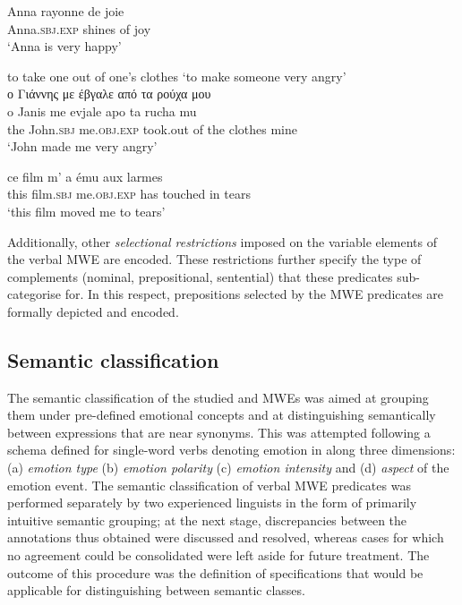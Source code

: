 \documentclass[output=paper]{langsci/langscibook}
\begin{document}
\begin{exe}
\ex \label{ex:3:36}
\gll Anna rayonne de joie \\
Anna.\textsc{sbj.exp} shines of joy\\
\glt ‘Anna is very happy’
\end{exe}

\begin{exe}
\ex \label{ex:3:37}
to take one out of one's clothes `to make someone very angry'\\
\glll ο Γιάννης με έβγαλε από τα ρούχα μου \\
o Janis me evjale apo ta rucha mu\\
the John.\textsc{sbj} me.\textsc{obj.exp} took.out of the clothes mine\\
\glt  %
‘John made me very angry’
\end{exe}

\begin{exe}
\ex \label{ex:3:38}
\gll ce film m' a ému aux larmes \\
this film.\textsc{sbj} me.\textsc{obj.exp} has touched in tears\\
\glt ‘this film moved me to tears’
\end{exe}

Additionally, other \textit{selectional restrictions} imposed
on the variable elements of the verbal MWE are encoded. These
restrictions further specify the type of complements (nominal,
prepositional, sentential) that these predicates sub-categorise for. In
this respect, prepositions selected by the MWE predicates are formally
depicted and encoded.





\subsection{Semantic classification}



The semantic classification of the studied  and  MWEs  was aimed at
grouping them under pre-defined emotional concepts and at
distinguishing semantically between expressions that are near synonyms.
This was attempted following a schema defined for single-word  verbs
denoting emotion in \citep{giouli2012}  along three dimensions:
(a) \textit{emotion type} (b)  \textit{emotion
polarity} (c) \textit{emotion intensity}  and (d)
\textit{aspect} of the emotion event. The semantic
classification of verbal MWE predicates was performed separately by two
experienced linguists in the form of primarily intuitive semantic
grouping; at the next stage, discrepancies between the annotations thus
obtained were discussed and resolved, whereas cases for which no
agreement could be consolidated were left aside for future treatment.
The outcome of this procedure was the definition of specifications that
would be applicable for distinguishing between semantic classes.
\end{document}
